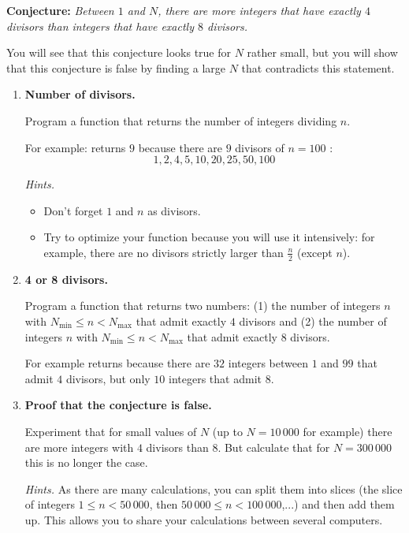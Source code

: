 \documentclass[11pt,class=report,crop=false]{standalone}
\begin{document}
\begin{activite}


\textbf{Conjecture: } \emph{Between $1$ and $N$, there are more integers that have exactly $4$ divisors than integers that have exactly $8$ divisors.}

You will see that this conjecture looks true for $N$ rather small, but you will show that this conjecture is false by finding a large $N$ that contradicts this statement.

\begin{enumerate}
  \item \textbf{Number of divisors.}
  
  Program a function  that returns the number of integers dividing $n$.
  
  For example:  returns $9$ because there are $9$ divisors of $n=100$ :
  $$1,2,4,5,10,20,25,50,100$$
  
  \emph{Hints.}
  \begin{itemize}
    \item Don't forget $1$ and $n$ as divisors.
    \item Try to optimize your function because you will use it intensively: for example, there are no divisors strictly larger than $\frac n2$ (except $n$).    
   \end{itemize}
   
   
   \item \textbf{4 or 8 divisors.}
   
   Program a function  that returns two numbers: (1) the number of integers $n$ with $N_{\text{min}} \le n < N_{\text{max}}$ that admit exactly $4$ divisors and (2) the number of integers $n$ with $N_{\text{min}} \le n < N_{\text{max}}$ that admit exactly $8$ divisors.
   
   For example  returns  because there are $32$ integers between $1$ and $99$ that admit $4$ divisors, but only $10$ integers that admit $8$.
   
   \item \textbf{Proof that the conjecture is false.}
   
   Experiment that for \og{}small\fg{} values of $N$ (up to $N = 10\,000$ for example) there are more integers with $4$ divisors than $8$. But calculate that for $N=300\,000$ this is no longer the case.
   
   \emph{Hints.} As there are many calculations, you can split them into slices (the slice of integers $1\le n < 50\,000$, then $50\,000 \le n < 100\,000$,...) and then add them up.
   This allows you to share your calculations between several computers.
   
\end{enumerate}   
     
\end{activite}
\end{document}
